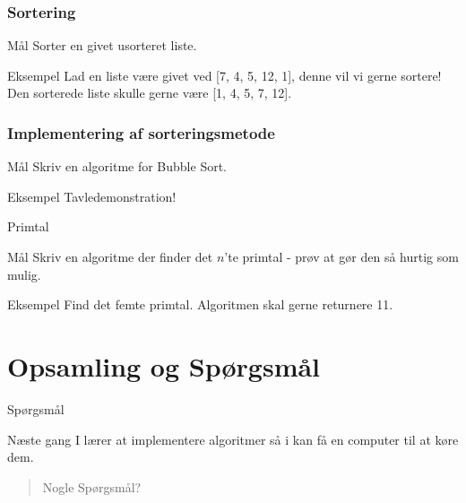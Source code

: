 \documentclass[12pt,t]{beamer}
\begin{document}
    \begin{frame}
      \frametitle{Sortering}
      \begin{block}{Mål}
      Sorter en givet usorteret liste.
      \end{block}
      \pause

      \begin{exampleblock}{Eksempel}
      Lad en liste være givet ved [7, 4, 5, 12, 1], denne vil vi gerne sortere!
      Den sorterede liste skulle gerne være [1, 4, 5, 7, 12].
      \end{exampleblock}
    \end{frame}

    \begin{frame}
      \frametitle{Implementering af sorteringsmetode}
      \begin{block}{Mål}
      Skriv en algoritme for Bubble Sort.
      \end{block}
      \pause

      \begin{exampleblock}{Eksempel}
      Tavledemonstration!
      \end{exampleblock}
    \end{frame}

    \begin{frame}{Primtal}
      \begin{block}{Mål}
      Skriv en algoritme der finder det $n$'te primtal - prøv at gør den så
      hurtig som mulig.
      \end{block}
      \pause

      \begin{exampleblock}{Eksempel}
      Find det femte primtal. Algoritmen skal gerne returnere 11.
      \end{exampleblock}
    \end{frame}


\section{Opsamling og Spørgsmål}
    \begin{frame}[c]{Spørgsmål}
        \begin{block}{Næste gang}
            I lærer at implementere algoritmer så i kan få en computer til at
            køre dem.
        \end{block}
        \begin{quote}
            \centering Nogle Spørgsmål?
        \end{quote}
    \end{frame}
\end{document}
